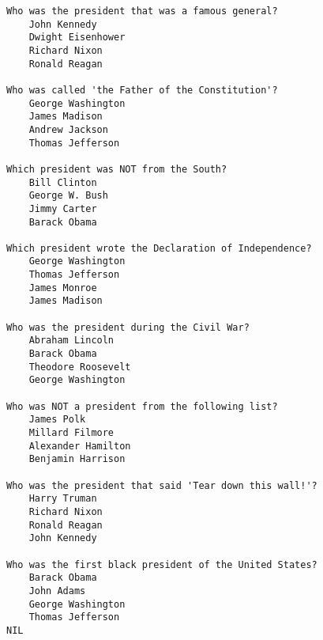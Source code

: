 \documentclass{article}
\begin{document}
\begin{lstlisting}[caption = My output]
Who was the president that was a famous general?
    John Kennedy
    Dwight Eisenhower
    Richard Nixon
    Ronald Reagan

Who was called 'the Father of the Constitution'?
    George Washington
    James Madison
    Andrew Jackson
    Thomas Jefferson

Which president was NOT from the South?
    Bill Clinton
    George W. Bush
    Jimmy Carter
    Barack Obama

Which president wrote the Declaration of Independence?
    George Washington
    Thomas Jefferson
    James Monroe
    James Madison

Who was the president during the Civil War?
    Abraham Lincoln
    Barack Obama
    Theodore Roosevelt
    George Washington

Who was NOT a president from the following list?
    James Polk
    Millard Filmore
    Alexander Hamilton
    Benjamin Harrison

Who was the president that said 'Tear down this wall!'?
    Harry Truman
    Richard Nixon
    Ronald Reagan
    John Kennedy

Who was the first black president of the United States?
    Barack Obama
    John Adams
    George Washington
    Thomas Jefferson
NIL
\end{lstlisting}
\end{document}
